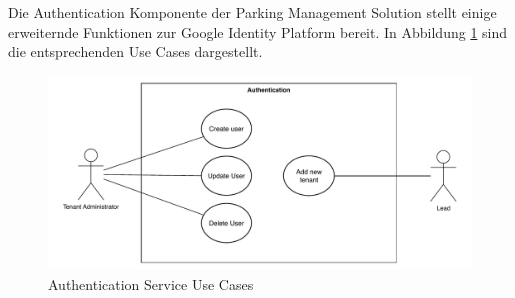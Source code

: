 Die Authentication Komponente der Parking Management Solution stellt einige erweiternde Funktionen zur Google Identity Platform bereit. In Abbildung \ref{fig:auth-use-cases} sind die entsprechenden Use Cases dargestellt.


\begin{figure}[ht]
    \centering
    \includegraphics[width=\textwidth]{resources/auth-use-cases.pdf}
    \caption{Authentication Service Use Cases}
    \label{fig:auth-use-cases}
\end{figure}
